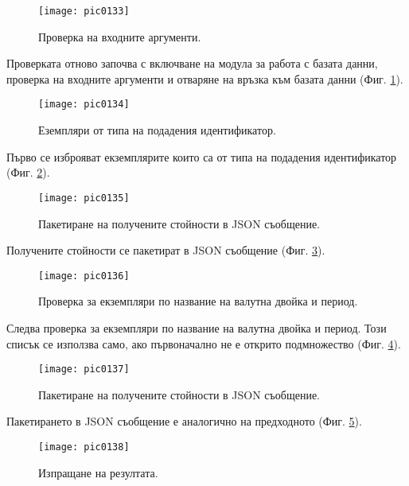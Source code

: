 \begin{figure}[h]
  \centering
  \texttt{[image: pic0133]}
  \caption{Проверка на входните аргументи.}
\label{fig:pic0133}
\end{figure}
\FloatBarrier

Проверката отново започва с включване на модула за работа с базата данни, проверка на входните аргументи и отваряне на връзка към базата данни (Фиг. \ref{fig:pic0133}).

\begin{figure}[h]
  \centering
  \texttt{[image: pic0134]}
  \caption{Еземпляри от типа на подадения идентификатор.}
\label{fig:pic0134}
\end{figure}
\FloatBarrier

Първо се изброяват екземплярите които са от типа на подадения идентификатор (Фиг. \ref{fig:pic0134}).

\begin{figure}[h]
  \centering
  \texttt{[image: pic0135]}
  \caption{Пакетиране на получените стойности в JSON съобщение.}
\label{fig:pic0135}
\end{figure}
\FloatBarrier

Получените стойности се пакетират в JSON съобщение (Фиг. \ref{fig:pic0135}). 

\begin{figure}[h]
  \centering
  \texttt{[image: pic0136]}
  \caption{Проверка за екземпляри по название на валутна двойка и период.}
\label{fig:pic0136}
\end{figure}
\FloatBarrier

Следва проверка за екземпляри по название на валутна двойка и период. Този списък се използва само, ако първоначално не е открито подмножество (Фиг. \ref{fig:pic0136}).

\begin{figure}[h]
  \centering
  \texttt{[image: pic0137]}
  \caption{Пакетиране на получените стойности в JSON съобщение.}
\label{fig:pic0137}
\end{figure}
\FloatBarrier

Пакетирането в JSON съобщение е аналогично на предходното (Фиг. \ref{fig:pic0137}).

\begin{figure}[h]
  \centering
  \texttt{[image: pic0138]}
  \caption{Изпращане на резултата.}
\label{fig:pic0138}
\end{figure}
\FloatBarrier

